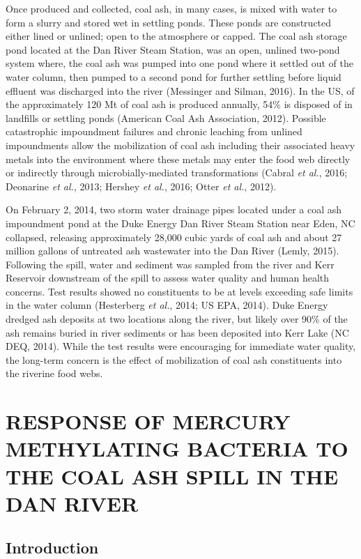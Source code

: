 \documentclass[ms, hidelinks]{uncgdissertationexp}
\theoremstyle{plain}
\theoremstyle{definition}
\theoremstyle{remark}
\begin{document}
Once produced and collected, coal ash, in many cases, is mixed with water to form a slurry and stored wet in settling ponds. These ponds are constructed either lined or unlined; open to the atmosphere or capped. The coal ash storage pond located at the Dan River Steam Station, was an open, unlined two-pond system where, the coal ash was pumped into one pond where it settled out of the water column, then pumped to a second pond for further settling before liquid effluent was discharged into the river (Messinger and Silman, 2016). In the US, of the approximately 120 Mt of coal ash is produced annually, 54\% is disposed of in landfills or settling ponds (American Coal Ash Association, 2012). Possible catastrophic impoundment failures and chronic leaching from unlined impoundments allow the mobilization of coal ash including their associated heavy metals into the environment where these metals may enter the food web directly or indirectly through microbially-mediated transformations (Cabral \emph{et al.}, 2016; Deonarine \emph{et al.}, 2013; Hershey \emph{et al.}, 2016; Otter \emph{et al.}, 2012).

On February 2, 2014, two storm water drainage pipes located under a coal ash impoundment pond at the Duke Energy Dan River Steam Station near Eden, NC collapsed, releasing approximately 28,000 cubic yards of coal ash and about 27 million gallons of untreated ash wastewater into the Dan River (Lemly, 2015). Following the spill, water and sediment was sampled from the river and Kerr Reservoir downstream of the spill to assess water quality and human health concerns. Test results showed no constituents to be at levels exceeding safe limits in the water column (Hesterberg \emph{et al.}, 2014; US EPA, 2014). Duke Energy dredged ash deposits at two locations along the river, but likely over 90\% of the ash remains buried in river sediments or has been deposited into Kerr Lake (NC DEQ, 2014). While the test results were encouraging for immediate water quality, the long-term concern is the effect of mobilization of coal ash constituents into the riverine food webs.

\hypertarget{pcr}{%
\chapter{RESPONSE OF MERCURY METHYLATING BACTERIA TO THE COAL ASH SPILL IN THE DAN RIVER}\label{pcr}}

\hypertarget{introduction}{%
\section{Introduction}\label{introduction}}
\end{document}

